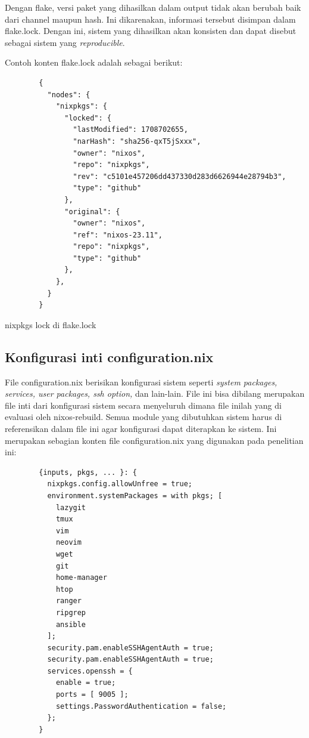 \documentclass[10pt,twoside]{report}
\newenvironment{code}{\captionsetup{type=listing}}{\vspace{3mm}}
\begin{document}
\begin{adjustwidth}{20pt}{}
\begin{adjustwidth}{20pt}{}
		Dengan flake, versi paket yang dihasilkan dalam output tidak akan berubah
		baik dari channel maupun hash. Ini dikarenakan, informasi tersebut disimpan
		dalam flake.lock. Dengan ini, sistem yang dihasilkan akan konsisten dan
		dapat disebut sebagai sistem yang \textit{reproducible}.

		Contoh konten flake.lock adalah sebagai berikut:

		\begin{code}
			\begin{verbatim}
        {
          "nodes": {
            "nixpkgs": {
              "locked": {
                "lastModified": 1708702655,
                "narHash": "sha256-qxT5jSxxx",
                "owner": "nixos",
                "repo": "nixpkgs",
                "rev": "c5101e457206dd437330d283d6626944e28794b3",
                "type": "github"
              },
              "original": {
                "owner": "nixos",
                "ref": "nixos-23.11",
                "repo": "nixpkgs",
                "type": "github"
              },
            },
          }
        }
      \end{verbatim}
			\caption{nixpkgs lock di flake.lock}
		\end{code}

	\end{adjustwidth}
	\subsection{Konfigurasi inti configuration.nix}
	\vspace{-3mm}
	\begin{adjustwidth}{20pt}{}
		File configuration.nix berisikan konfigurasi sistem seperti \textit{system
			packages, services, user packages, ssh option, }dan lain-lain. File ini
		bisa dibilang merupakan file inti dari konfigurasi sistem secara menyeluruh
		dimana file inilah yang di evaluasi oleh nixos-rebuild. Semua module yang
		dibutuhkan sistem harus di referensikan dalam file ini agar konfigurasi
		dapat diterapkan ke sistem.
		Ini merupakan sebagian konten file configuration.nix yang digunakan pada
		penelitian ini:

		\begin{code}
			\begin{verbatim}
        {inputs, pkgs, ... }: {
          nixpkgs.config.allowUnfree = true;
          environment.systemPackages = with pkgs; [
            lazygit
            tmux
            vim
            neovim
            wget
            git
            home-manager
            htop
            ranger
            ripgrep
            ansible
          ];
          security.pam.enableSSHAgentAuth = true;
          security.pam.enableSSHAgentAuth = true;
          services.openssh = {
            enable = true;
            ports = [ 9005 ];
            settings.PasswordAuthentication = false;
          };
        }
      \end{verbatim}
		\end{code}
	\end{adjustwidth}

\end{adjustwidth}
\end{document}
